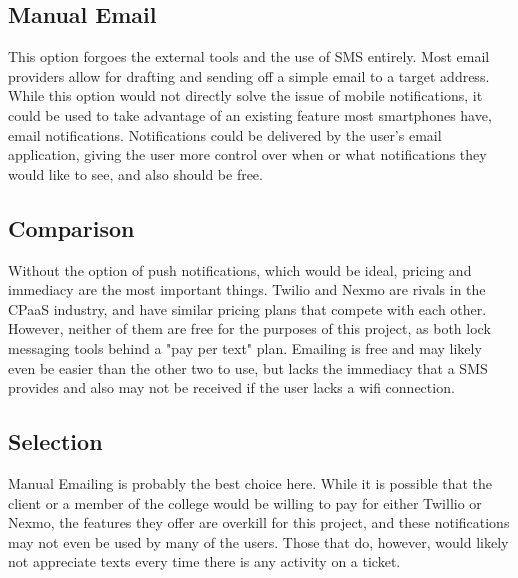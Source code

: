 \documentclass[onecolumn, draftclsnofoot,10pt, compsoc]{IEEEtran}
\begin{document}
\subsection{Manual Email}
This option forgoes the external tools and the use of SMS entirely. Most email providers allow for drafting and sending off a simple email to a target address. While this option would not 
directly solve the issue of mobile notifications, it could be used to take advantage of an existing feature most smartphones have, email notifications. Notifications could be delivered by the user's 
email application, giving the user more control over when or what notifications they would like to see, and also should be free. 
\subsection{Comparison}
Without the option of push notifications, which would be ideal, pricing and immediacy are the most important things. Twilio and Nexmo are rivals in the CPaaS industry, and have similar pricing plans that
compete with each other. However, neither of them are free for the purposes of this project, as both lock messaging tools behind a "pay per text" plan. Emailing is free and may likely even be easier 
than the other two to use, but lacks the immediacy that a SMS provides and also may not be received if the user lacks a wifi connection.
\subsection{Selection}
Manual Emailing is probably the best choice here. While it is possible that the client or a member of the college would be willing to pay for either Twillio or Nexmo, the features they offer are overkill
for this project, and these notifications may not even be used by many of the users. Those that do, however, would likely not appreciate texts every time there is any activity on a ticket.






\end{document}
